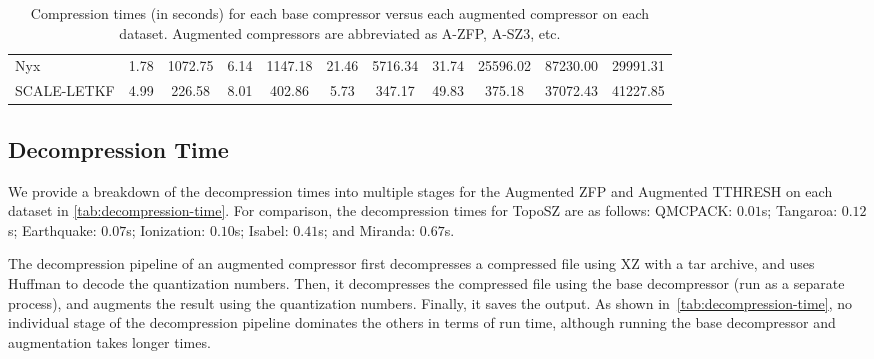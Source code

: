 \begin{table*}[!ht]
{\begin{tabular}{l|cc|cc|cc|cc|cc}
Nyx         & 1.78                    & 1072.75                    & 6.14                    & 1147.18                    & 21.46                   & 5716.34                    & 31.74                       & 25596.02                       &   87230.00                           &       29991.31                         \\
SCALE-LETKF & 4.99                    & 226.58                     & 8.01                    & 402.86                     & 5.73                    & 347.17                     & 49.83                       & 375.18                         & 37072.43                     & 41227.85                       \\ \hline
\end{tabular}}
\vspace{-2mm}
\caption{Compression times (in seconds) for each base compressor versus each augmented compressor on each dataset. Augmented compressors are abbreviated as A-ZFP, A-SZ3, etc.}
\label{tab:base-compressor-times}
\vspace{-4mm}
\end{table*}

\subsection{Decompression Time}
\label{sec:decompression-time-analysis}

We provide a breakdown of the decompression times into multiple stages for the Augmented ZFP and Augmented TTHRESH on each dataset in \cref{tab:decompression-time}. 
For comparison, the decompression times for TopoSZ are as follows: QMCPACK: $0.01$s; Tangaroa: $0.12$s; Earthquake: $0.07$s; Ionization: $0.10$s; Isabel: $0.41$s; and Miranda: $0.67$s.

The decompression pipeline of an augmented compressor first decompresses a compressed file using XZ with a tar archive, and uses Huffman to decode the quantization numbers. Then, it decompresses the compressed file using the base decompressor (run as a separate process), and augments the result using the quantization numbers. Finally, it saves the output. As shown in~\cref{tab:decompression-time}, no individual stage of the decompression pipeline dominates the others in terms of run time, although running the base decompressor and augmentation takes  longer times. 

